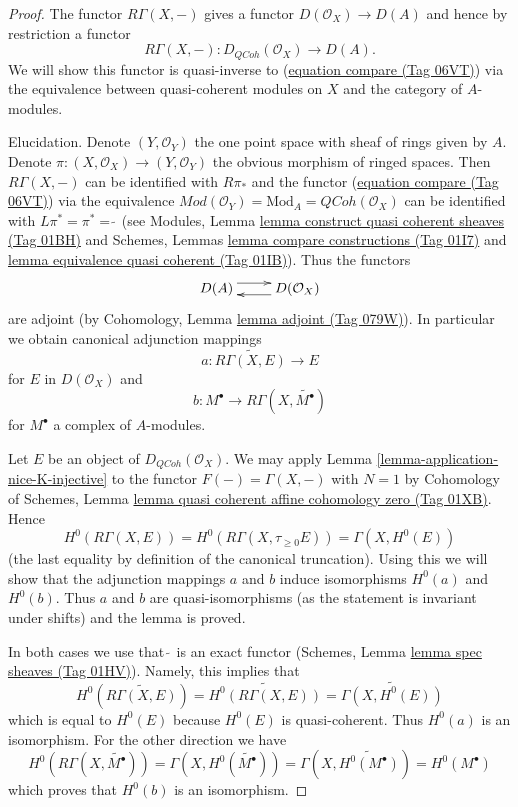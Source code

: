 \documentclass{amsart}
\theoremstyle{plain}
\theoremstyle{definition}
\theoremstyle{remark}
\numberwithin{equation}{subsection}
\def\QCoh{\mathit{QCoh}}
\begin{document}
\begin{proof}
The functor $R\Gamma(X, -)$ gives a functor
$D(\mathcal{O}_X) \to D(A)$ and hence by restriction a functor
\begin{equation}
\label{equation-back}
R\Gamma(X, -) : D_\QCoh(\mathcal{O}_X) \longrightarrow D(A).
\end{equation}
We will show this functor is quasi-inverse to (\href{https://stacks.math.columbia.edu/tag/06VT}{equation compare (Tag 06VT)})
via the equivalence between quasi-coherent modules on $X$ and
the category of $A$-modules.

\medskip\noindent
Elucidation. Denote $(Y, \mathcal{O}_Y)$ the one point space with sheaf
of rings given by $A$. Denote
$\pi : (X, \mathcal{O}_X) \to (Y, \mathcal{O}_Y)$
the obvious morphism of ringed spaces.
Then $R\Gamma(X, -)$ can be identified with $R\pi_*$ and the functor
(\href{https://stacks.math.columbia.edu/tag/06VT}{equation compare (Tag 06VT)}) via the equivalence
$\textit{Mod}(\mathcal{O}_Y) = \text{Mod}_A = \QCoh(\mathcal{O}_X)$
can be identified with $L\pi^* = \pi^* = \widetilde{\ }$ (see
Modules, Lemma \href{https://stacks.math.columbia.edu/tag/01BH}{lemma construct quasi coherent sheaves (Tag 01BH)} and
Schemes, Lemmas \href{https://stacks.math.columbia.edu/tag/01I7}{lemma compare constructions (Tag 01I7)} and
\href{https://stacks.math.columbia.edu/tag/01IB}{lemma equivalence quasi coherent (Tag 01IB)}). Thus the functors
$$
\xymatrix{
D(A) \ar@<1ex>[r] & D(\mathcal{O}_X) \ar@<1ex>[l]
}
$$
are adjoint (by Cohomology, Lemma \href{https://stacks.math.columbia.edu/tag/079W}{lemma adjoint (Tag 079W)}). In
particular we obtain canonical adjunction mappings
$$
a : \widetilde{R\Gamma(X, E)} \longrightarrow E
$$
for $E$ in $D(\mathcal{O}_X)$ and
$$
b : M^\bullet \longrightarrow R\Gamma(X, \widetilde{M^\bullet})
$$
for $M^\bullet$ a complex of $A$-modules.

\medskip\noindent
Let $E$ be an object of $D_\QCoh(\mathcal{O}_X)$. We may apply
Lemma \ref{lemma-application-nice-K-injective}
to the functor $F(-) = \Gamma(X, -)$
with $N = 1$ by Cohomology of Schemes, Lemma
\href{https://stacks.math.columbia.edu/tag/01XB}{lemma quasi coherent affine cohomology zero (Tag 01XB)}.
Hence
$$
H^0(R\Gamma(X, E)) = H^0(R\Gamma(X, \tau_{\geq 0}E)) = \Gamma(X, H^0(E))
$$
(the last equality by definition of the canonical truncation).
Using this we will show that the adjunction mappings $a$ and $b$
induce isomorphisms $H^0(a)$ and $H^0(b)$. Thus $a$ and $b$
are quasi-isomorphisms (as the statement is invariant under shifts)
and the lemma is proved.

\medskip\noindent
In both cases we use that $\widetilde{\ }$ is an exact functor
(Schemes, Lemma \href{https://stacks.math.columbia.edu/tag/01HV}{lemma spec sheaves (Tag 01HV)}). Namely, this
implies that
$$
H^0\left(\widetilde{R\Gamma(X, E)}\right) =
\widetilde{H^0(R\Gamma(X, E))} =
\widetilde{\Gamma(X, H^0(E))}
$$
which is equal to $H^0(E)$ because $H^0(E)$ is quasi-coherent. Thus
$H^0(a)$ is an isomorphism. For the other direction we have
$$
H^0(R\Gamma(X, \widetilde{M^\bullet})) =
\Gamma(X, H^0(\widetilde{M^\bullet})) =
\Gamma(X, \widetilde{H^0(M^\bullet)}) =
H^0(M^\bullet)
$$
which proves that $H^0(b)$ is an isomorphism.
\end{proof}
\end{document}
